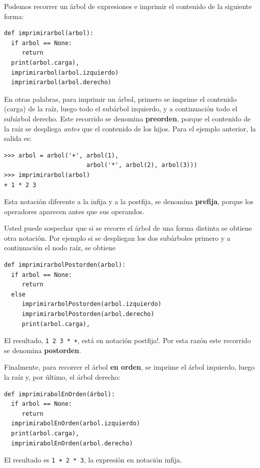 Podemos recorrer un árbol de expresiones e imprimir el contenido de
la siguiente forma:

\beforeverb 
\begin{verbatim}
def imprimirarbol(arbol):
  if arbol == None: 
     return
  print(arbol.carga),
  imprimirarbol(arbol.izquierdo)
  imprimirarbol(arbol.derecho)
\end{verbatim}
\afterverb {} 

En otras palabras, para imprimir un árbol, primero se imprime el contenido
(carga) de la raíz, luego todo el subárbol izquierdo, y a continuación
todo el subárbol derecho. Este recorrido se denomina \textbf{preorden},
porque el contenido de la raíz se despliega {\em antes} que el
contenido de los hijos. Para el ejemplo anterior, la salida es:

\beforeverb 
\begin{verbatim}
>>> arbol = arbol('+', arbol(1), 
                       arbol('*', arbol(2), arbol(3)))
>>> imprimirarbol(arbol)
+ 1 * 2 3
\end{verbatim}
\afterverb Esta notación diferente a la infija y a la postfija, se
denomina \textbf{prefija}, porque los operadores aparecen antes que
sus operandos.

Usted puede sospechar que si se recorre el árbol de una forma distinta
se obtiene otra notación. Por ejemplo si se despliegan los dos subárboles
primero y a continuación el nodo raíz, se obtiene

\beforeverb 
\begin{verbatim}
def imprimirarbolPostorden(arbol):
  if arbol == None: 
     return
  else 
     imprimirarbolPostorden(arbol.izquierdo)
     imprimirarbolPostorden(arbol.derecho)
     print(arbol.carga),
\end{verbatim}
\afterverb {}  El resultado, \texttt{1
2 3 {*} +}, está en notación postfija!. Por esta razón este recorrido
se denomina \textbf{postorden}.

Finalmente, para recorrer el árbol \textbf{en orden}, se imprime el
árbol izquierdo, luego la raíz y, por último, el árbol derecho:

\beforeverb 
\begin{verbatim}
def imprimirabolEnOrden(árbol):
  if arbol == None: 
     return
  imprimirabolEnOrden(arbol.izquierdo)
  print(arbol.carga),
  imprimirabolEnOrden(arbol.derecho)
\end{verbatim}
\afterverb El resultado es \texttt{1 + 2 {*} 3}, la expresión en
notación infija.

